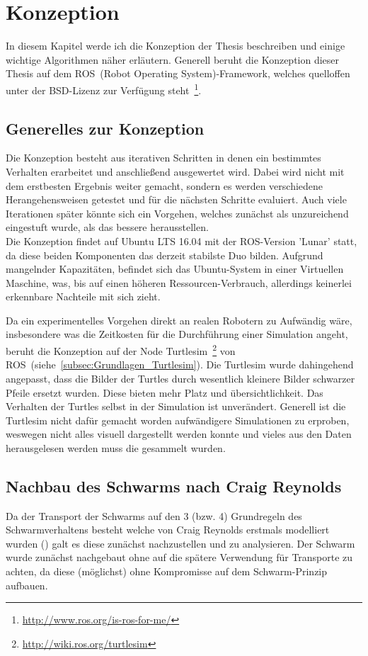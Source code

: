 \chapter{Konzeption}\label{ch:Konzeption}

In diesem Kapitel werde ich die Konzeption der Thesis beschreiben und einige wichtige Algorithmen näher erläutern. Generell beruht die Konzeption dieser Thesis auf dem ROS~(Robot Operating System)-Framework, welches quelloffen unter der BSD-Lizenz zur Verfügung steht~\footnote{\url{http://www.ros.org/is-ros-for-me/}}.

\section{Generelles zur Konzeption}
Die Konzeption besteht aus iterativen Schritten in denen ein bestimmtes Verhalten erarbeitet und anschließend ausgewertet wird. Dabei wird nicht mit dem erstbesten Ergebnis weiter gemacht, sondern es werden verschiedene Herangehensweisen getestet und für die nächsten Schritte evaluiert. Auch viele Iterationen später könnte sich ein Vorgehen, welches zunächst als unzureichend eingestuft wurde, als das bessere herausstellen.\\

Die Konzeption findet auf Ubuntu LTS 16.04 mit der ROS-Version 'Lunar' statt, da diese beiden Komponenten das derzeit stabilste Duo bilden. Aufgrund mangelnder Kapazitäten, befindet sich das Ubuntu-System in einer Virtuellen Maschine, was, bis auf einen höheren Ressourcen-Verbrauch, allerdings keinerlei erkennbare Nachteile mit sich zieht.

Da ein experimentelles Vorgehen direkt an realen Robotern zu Aufwändig wäre, insbesondere was die Zeitkosten für die Durchführung einer Simulation angeht, beruht die Konzeption auf der Node Turtlesim~\footnote{\url{http://wiki.ros.org/turtlesim}} von ROS~(siehe~\autoref{subsec:Grundlagen_Turtlesim}). Die Turtlesim wurde dahingehend angepasst, dass die Bilder der Turtles durch wesentlich kleinere Bilder schwarzer Pfeile ersetzt wurden. Diese bieten mehr Platz und übersichtlichkeit. Das Verhalten der Turtles selbst in der Simulation ist unverändert.
Generell ist die Turtlesim nicht dafür gemacht worden aufwändigere Simulationen zu erproben, weswegen nicht alles visuell dargestellt werden konnte und vieles aus den Daten herausgelesen werden muss die gesammelt wurden.

\section{Nachbau des Schwarms nach Craig Reynolds}
Da der Transport der Schwarms auf den 3 (bzw. 4) Grundregeln des Schwarmverhaltens besteht welche von Craig Reynolds erstmals modelliert wurden () galt es diese zunächst nachzustellen und zu analysieren. Der Schwarm wurde zunächst nachgebaut ohne auf die spätere Verwendung für Transporte zu achten, da diese (möglichst) ohne Kompromisse auf dem Schwarm-Prinzip aufbauen.

